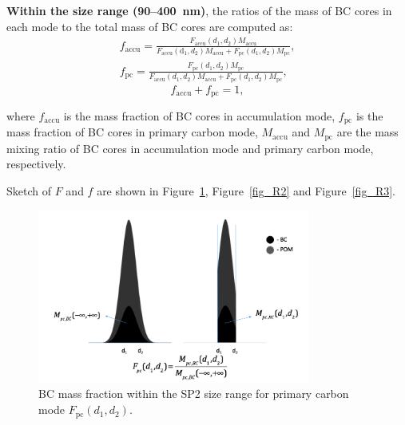 \documentclass[12pt, fullpage]{uiucthesis2009}
\begin{document}
	\textbf{Within the size range (90--400~nm)}, the ratios of the mass of BC cores in each mode to the total mass of BC cores are computed as:
	\begin{align*}
	f_{\text{accu}} = \frac{F_{\text{accu}}(d_{1}, d_{2})M_{\text{accu}}}{F_{\text{accu}}(\text{d}_{1}, d_{2})M_{\text{accu}}+F_{\text{pc}}(d_{1}, d_{2})M_{\text{pc}}},\\
	f_{\text{pc}} = \frac{F_{\text{pc}}(d_{1}, d_{2})M_{\text{pc}}}{F_{\text{accu}}(d_{1}, d_{2})M_{\text{accu}}+F_{\text{pc}}(d_{1}, d_{2})M_{\text{pc}}},
	\end{align*}
	\[f_{\text{accu}} + f_{\text{pc}} = 1,\]
	
	where $f_{\text{accu}}$ is the mass fraction of BC cores in
	accumulation mode, $f_{\text{pc}}$ is the mass fraction of BC cores in
	primary carbon mode, $M_{\text{accu}}$ and $M_{\text{pc}}$ are the mass mixing ratio of BC cores
	in accumulation mode and primary carbon mode, respectively.
	
	Sketch of $F$ and $f$ are shown in Figure~\ref{fig_R1}, Figure~\ref{fig_R2} and Figure~\ref{fig_R3}.
	
	\begin{figure}[h] 
		\begin{center}
			\includegraphics[width = 0.8\textwidth]{Rplot05}
			\caption[BC mass fraction within the SP2 size range for primary carbon mode $F_{\text{pc}}(d_{1}, d_{2})$]{\label{fig_R1} BC mass fraction within the SP2 size range for primary carbon mode $F_{\text{pc}}(d_{1}, d_{2})$.}
		\end{center}
	\end{figure}
	
\end{document}
